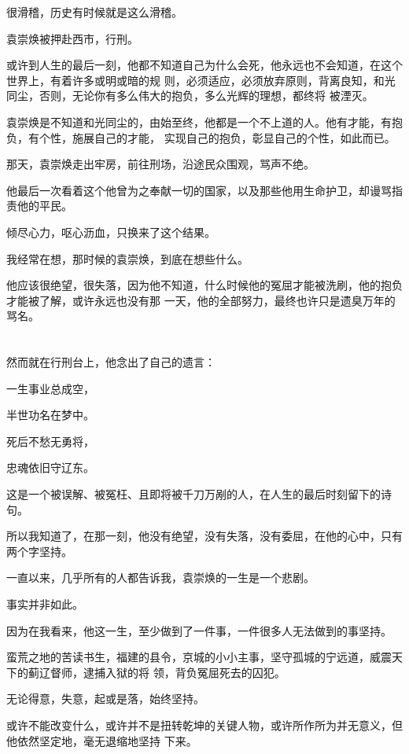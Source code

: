 \documentclass[11pt,a4paper,onecolumn]{article}
\begin{document}
很滑稽，历史有时候就是这么滑稽。

袁崇焕被押赴西市，行刑。

或许到人生的最后一刻，他都不知道自己为什么会死，他永远也不会知道，在这个世界上，有着许多或明或暗的规
则，必须适应，必须放弃原则，背离良知，和光同尘，否则，无论你有多么伟大的抱负，多么光辉的理想，都终将
被湮灭。

袁崇焕是不知道和光同尘的，由始至终，他都是一个不上道的人。他有才能，有抱负，有个性，施展自己的才能，
实现自己的抱负，彰显自己的个性，如此而已。

那天，袁崇焕走出牢房，前往刑场，沿途民众围观，骂声不绝。

他最后一次看着这个他曾为之奉献一切的国家，以及那些他用生命护卫，却谩骂指责他的平民。

倾尽心力，呕心沥血，只换来了这个结果。

我经常在想，那时候的袁崇焕，到底在想些什么。

他应该很绝望，很失落，因为他不知道，什么时候他的冤屈才能被洗刷，他的抱负才能被了解，或许永远也没有那
一天，他的全部努力，最终也许只是遗臭万年的骂名。

\section[\thesection]{}

然而就在行刑台上，他念出了自己的遗言：

一生事业总成空，

半世功名在梦中。

死后不愁无勇将，

忠魂依旧守辽东。

这是一个被误解、被冤枉、且即将被千刀万剐的人，在人生的最后时刻留下的诗句。

所以我知道了，在那一刻，他没有绝望，没有失落，没有委屈，在他的心中，只有两个字\myrule 坚持。

一直以来，几乎所有的人都告诉我，袁崇焕的一生是一个悲剧。

事实并非如此。

因为在我看来，他这一生，至少做到了一件事，一件很多人无法做到的事\myrule 坚持。

蛮荒之地的苦读书生，福建的县令，京城的小小主事，坚守孤城的宁远道，威震天下的蓟辽督师，逮捕入狱的将
领，背负冤屈死去的囚犯。

无论得意，失意，起或是落，始终坚持。

或许不能改变什么，或许并不是扭转乾坤的关键人物，或许所作所为并无意义，但他依然坚定地，毫无退缩地坚持
下来。
\end{document}

